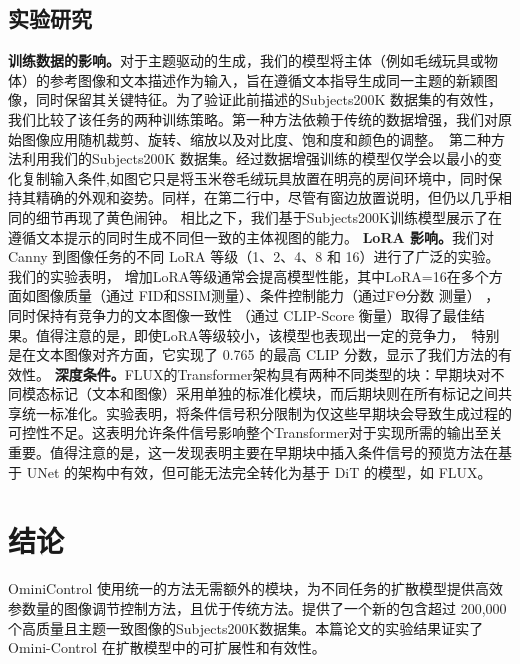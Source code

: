 \subsection{实验研究}
\textbf{训练数据的影响。}对于主题驱动的生成，我们的模型将主体（例如毛绒玩具或物体）的参考图像和文本描述作为输入，旨在遵循文本指导生成同一主题的新颖图像，同时保留其关键特征。为了验证此前描述的Subjects200K 数据集的有效性，我们比较了该任务的两种训练策略。第一种方法依赖于传统的数据增强，我们对原始图像应用随机裁剪、旋转、缩放以及对比度、饱和度和颜色的调整。\
第二种方法利用我们的Subjects200K 数据集。经过数据增强训练的模型仅学会以最小的变化复制输入条件,如图它只是将玉米卷毛绒玩具放置在明亮的房间环境中，同时保持其精确的外观和姿势。同样，在第二行中，尽管有窗边放置说明，但仍以几乎相同的细节再现了黄色闹钟。 相比之下，我们基于Subjects200K训练模型展示了在遵循文本提示的同时生成不同但一致的主体视图的能力。
\textbf{LoRA 影响。}我们对 Canny 到图像任务的不同 LoRA 等级（1、2、4、8 和 16）进行了广泛的实验。我们的实验表明， 增加LoRA等级通常会提高模型性能，其中LoRA=16在多个方面如图像质量（通过 FID和SSIM测量）、条件控制能力（通过FΘ分数 测量） ，同时保持有竞争力的文本图像一致性 （通过 CLIP-Score 衡量）取得了最佳结果。值得注意的是，即使LoRA等级较小，该模型也表现出一定的竞争力，\
特别是在文本图像对齐方面，它实现了 0.765 的最高 CLIP 分数，显示了我们方法的有效性。
\textbf{深度条件。}FLUX的Transformer架构具有两种不同类型的块：早期块对不同模态标记（文本和图像）采用单独的标准化模块，而后期块则在所有标记之间共享统一标准化。实验表明，将条件信号积分限制为仅这些早期块会导致生成过程的可控性不足。这表明允许条件信号影响整个Transformer对于实现所需的输出至关重要。值得注意的是，这一发现表明主要在早期块中插入条件信号的预览方法在基于 UNet 的架构中有效，但可能无法完全转化为基于 DiT 的模型，如 FLUX。
\section{结论}
OminiControl 使用统一的方法无需额外的模块，为不同任务的扩散模型提供高效参数量的图像调节控制方法，且优于传统方法。提供了一个新的包含超过 200,000 个高质量且主题一致图像的Subjects200K数据集。本篇论文的实验结果证实了 Omini-Control 在扩散模型中的可扩展性和有效性。

\begingroup
    \printbibliography[title={外文翻译参考文献}]
\endgroup

